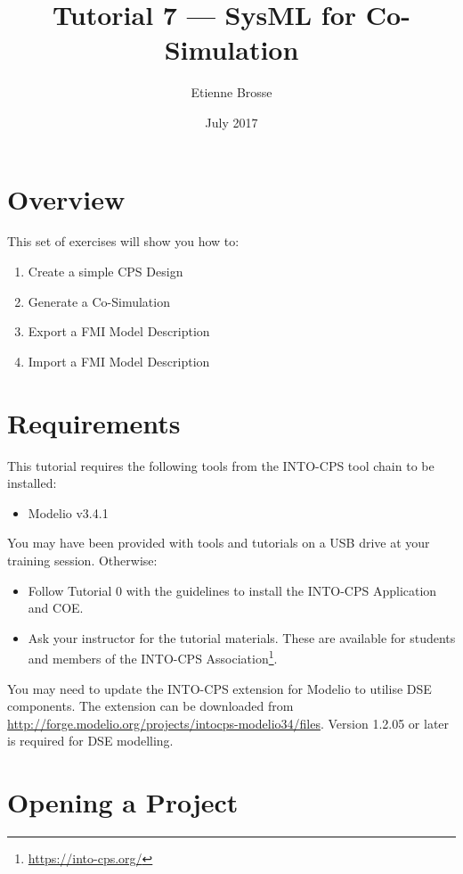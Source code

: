 \documentclass[11pt,a4paper]{../tutorial}
\title{Tutorial 7 --- SysML for Co-Simulation}
\date{July 2017}
\author{Etienne Brosse}
\begin{document}
\section*{Overview}

This set of exercises will show you how to:

\begin{enumerate}[noitemsep]
\item Create a simple CPS Design
\item Generate a Co-Simulation
\item Export a FMI Model Description
\item Import a FMI Model Description

\end{enumerate}

\section*{Requirements}

This tutorial requires the following tools from the INTO-CPS tool chain to be installed:

\begin{itemize}[noitemsep]
\item Modelio v3.4.1
\end{itemize}

You may have been provided with tools and tutorials on a USB drive at your training session. Otherwise: 
\begin{itemize}[noitemsep]
\item Follow Tutorial 0 with the guidelines to install the INTO-CPS Application and COE.
\item Ask your instructor for the tutorial materials. These are available for students and members of the INTO-CPS Association\footnote{\url{https://into-cps.org/}}.
\end{itemize}

\vspace{4mm}

You may need to update the INTO-CPS extension for Modelio to utilise DSE components. The extension can be downloaded from \mbox{\url{http://forge.modelio.org/projects/intocps-modelio34/files}}. Version 1.2.05 or later is required for DSE modelling.

\newpage

\section{Opening a Project}
\end{document}
